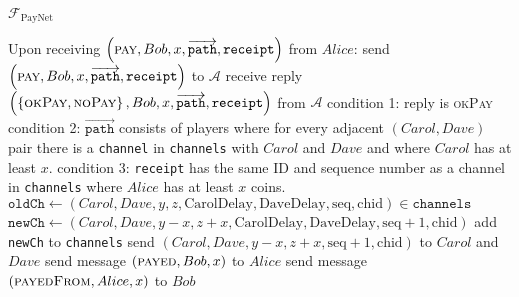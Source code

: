 \begin{functionality}{$\mathcal{F}_{\mathrm{PayNet}}$}
\begin{algorithmic}[1]
    \State Upon receiving $\left(\textsc{pay}, Bob, x,
    \overrightarrow{\mathtt{path}}, \mathtt{receipt}\right)$ from $Alice$:
    \Indent
      \State send $\left(\textsc{pay}, Bob, x, \overrightarrow{\mathtt{path}},
      \mathtt{receipt}\right)$ to $\mathcal{A}$
      \State receive reply $\left(\left\{\textsc{okPay}, \textsc{noPay}\right\},
      Bob, x, \overrightarrow{\mathtt{path}}, \mathtt{receipt}\right)$ from
      $\mathcal{A}$
      \State condition 1: reply is \textsc{okPay}
      \State condition 2: $\overrightarrow{\mathtt{path}}$ consists of players
      where for every adjacent $\left(Carol, Dave\right)$ pair there is a
      \texttt{channel} in \texttt{channels} with $Carol$ and $Dave$ and where
      $Carol$ has at least $x$.
      \State condition 3: \texttt{receipt} has the same ID and sequence number
      as a channel in \texttt{channels} where $Alice$ has at least $x$ coins.
          \State $\mathtt{oldCh} \gets \left(Carol, Dave, y, z,
          \mathrm{CarolDelay}, \mathrm{DaveDelay}, \mathrm{seq},
          \mathrm{chid}\right) \in \mathtt{channels}$
          \State $\mathtt{newCh} \gets \left(Carol, Dave, y - x, z + x,
          \mathrm{CarolDelay}, \mathrm{DaveDelay}, \mathrm{seq} + 1,
          \mathrm{chid}\right)$
          \State add \texttt{newCh} to \texttt{channels}
          \State send $\left(Carol, Dave, y - x, z + x, \mathrm{seq} + 1,
          \mathrm{chid}\right)$ to $Carol$ and $Dave$ 
        \EndFor
        \State send message $\left(\textsc{payed}, Bob, x\right)$ to $Alice$
        \State send message $\left(\textsc{payedFrom}, Alice, x\right)$ to $Bob$
      \EndIf
    \EndIndent
    \State


\end{algorithmic}
\end{functionality}
